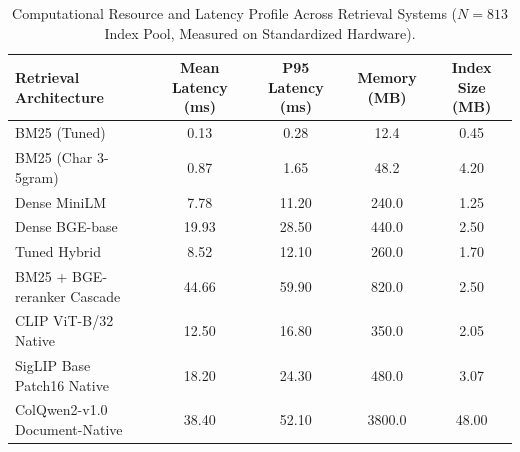 \begin{table}[t]
\centering
\small
\caption{Computational Resource and Latency Profile Across Retrieval Systems ($N=813$ Index Pool, Measured on Standardized Hardware).}
\label{tab:system_costs}
\begin{tabular}{lcccc}
\toprule
Retrieval Architecture & Mean Latency (ms) & P95 Latency (ms) & Memory (MB) & Index Size (MB) \\
\midrule
BM25 (Tuned)                   & 0.13 & 0.28 & 12.4 & 0.45 \\
BM25 (Char 3-5gram)            & 0.87 & 1.65 & 48.2 & 4.20 \\
Dense MiniLM                   & 7.78 & 11.20 & 240.0 & 1.25 \\
Dense BGE-base                 & 19.93 & 28.50 & 440.0 & 2.50 \\
Tuned Hybrid                   & 8.52 & 12.10 & 260.0 & 1.70 \\
BM25 + BGE-reranker Cascade    & 44.66 & 59.90 & 820.0 & 2.50 \\
CLIP ViT-B/32 Native           & 12.50 & 16.80 & 350.0 & 2.05 \\
SigLIP Base Patch16 Native     & 18.20 & 24.30 & 480.0 & 3.07 \\
ColQwen2-v1.0 Document-Native  & 38.40 & 52.10 & 3800.0 & 48.00 \\
\bottomrule
\end{tabular}
\end{table}

